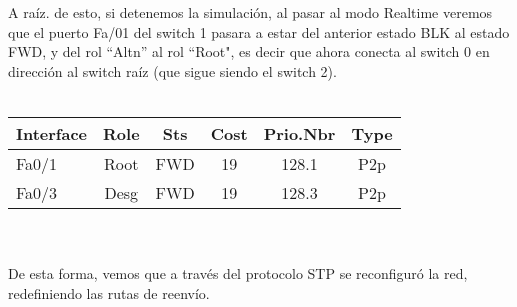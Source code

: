 \documentclass{article}
\begin{document}
A raíz. de esto, si detenemos la simulación, al pasar al modo Realtime veremos que el puerto Fa/01 del switch 1 pasara a estar del anterior estado BLK al estado FWD, y del rol ``Altn'' al rol ``Root", es decir que ahora conecta al switch 0 en dirección al switch raíz (que sigue siendo el switch 2). \\\\

\begin{tabular}{ | l | c | c | c | c | c | }
    \hline
    Interface & Role & Sts & Cost & Prio.Nbr & Type \\
    \hline
    Fa0/1 & Root & FWD & 19 & 128.1 & P2p \\
    Fa0/3 & Desg & FWD & 19 & 128.3 & P2p \\
    \hline    
\end{tabular} \\\\

De esta forma, vemos que a través del protocolo STP se reconfiguró la red, redefiniendo las rutas de reenvío. \\
\end{document}
